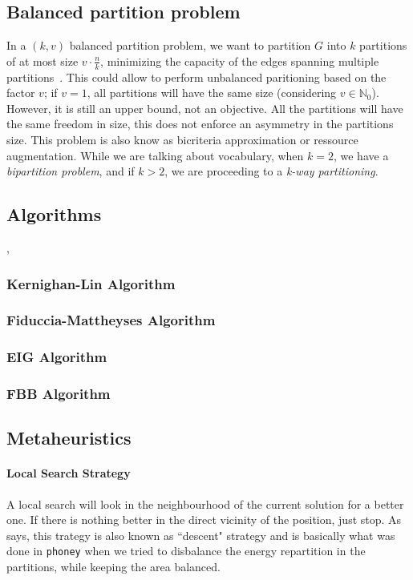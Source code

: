 \documentclass[12pt,a4paper]{article}
\theoremstyle{customdef}
\begin{document}
\subsection{Balanced partition problem}
In a $(k, v)$ balanced partition problem, we want to partition $G$ into $k$ partitions of at most size $v\cdot\frac{n}{k}$, minimizing the capacity of the edges spanning multiple partitions~\cite{Andreev:2004:BGP:1007912.1007931}.
This could allow to perform unbalanced paritioning based on the factor $v$; if $v = 1$, all partitions will have the same size (considering $v \in \mathbb{N}_0$).
However, it is still an upper bound, not an objective.
All the partitions will have the same freedom in size, this does not enforce an asymmetry in the partitions size.
This problem is also know as bicriteria approximation or ressource augmentation.
While we are talking about vocabulary, when $k=2$, we have a \textit{bipartition problem}, and if $k>2$, we are proceeding to a \textit{k-way partitioning}.

\subsection{Algorithms}
\cite{SungKyuLim:ECE6133:partitioning}, \cite{Lim2008}
\subsubsection{Kernighan-Lin Algorithm~\citep*{Kernighan1970}}

\subsubsection{Fiduccia-Mattheyses Algorithm~\citep*{Fiduccia1982}}

\subsubsection{EIG Algorithm~\citep*{Hagen1992}}

\subsubsection{FBB Algorithm~\citep*{Yang1996}}

\subsection{Metaheuristics}

\paragraph{Local Search Strategy}
A local search will look in the neighbourhood of the current solution for a better one.
If there is nothing better in the direct vicinity of the position, just stop.
As \cite{Pirlot1996} says, this trategy is also known as ``descent" strategy and is basically what was done in \texttt{phoney} when we tried to disbalance the energy repartition in the partitions, while keeping the area balanced.
\end{document}
